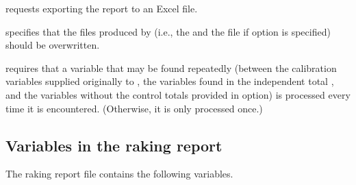 \hangpara
{} requests exporting the report to an Excel file.

\hangpara
{} specifies that the files produced by  (i.e., the 
    and the {} file if  option is specified) should be overwritten.

\hangpara
{} requires that a variable that may be found repeatedly (between the calibration variables
    supplied originally to , the variables found in the independent total ,
    and the variables without the control totals provided in  option) is processed every
    time it is encountered. (Otherwise, it is only processed once.)

\subsection{Variables in the raking report}

The raking report file contains the following variables.

\cnp

